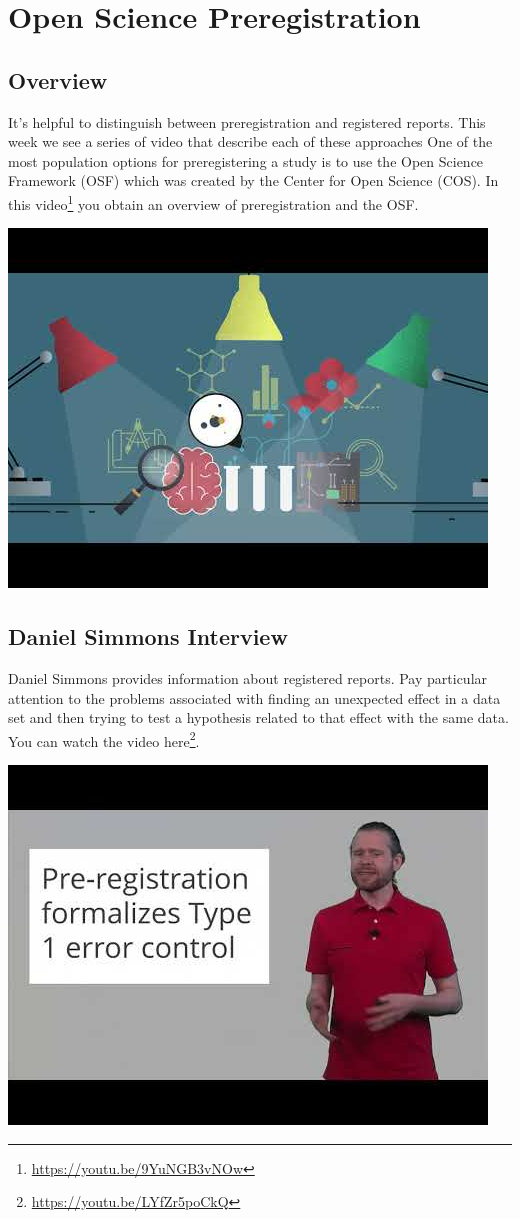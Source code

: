 \documentclass[
]{krantz}
\renewcommand{\href}[2]{#2\footnote{\url{#1}}}
\begin{document}
\hypertarget{open-science-preregistration}{%
\chapter{Open Science Preregistration}\label{open-science-preregistration}}

\hypertarget{overview-9}{%
\section{Overview}\label{overview-9}}

It's helpful to distinguish between preregistration and registered reports. This week we see a series of video that describe each of these approaches One of the most population options for preregistering a study is to use the Open Science Framework (OSF) which was created by the Center for Open Science (COS). In this \href{https://youtu.be/9YuNGB3vNOw}{video} you obtain an overview of preregistration and the OSF.

\includegraphics[width=0.4\linewidth]{ch_preregistration/images/prereg_overview}

\hypertarget{daniel-simmons-interview}{%
\section{Daniel Simmons Interview}\label{daniel-simmons-interview}}

Daniel Simmons provides information about registered reports. Pay particular attention to the problems associated with finding an unexpected effect in a data set and then trying to test a hypothesis related to that effect with the same data. You can watch the video \href{https://youtu.be/LYfZr5poCkQ}{here}.

\includegraphics[width=0.4\linewidth]{ch_preregistration/images/prereg_ds}
\end{document}
